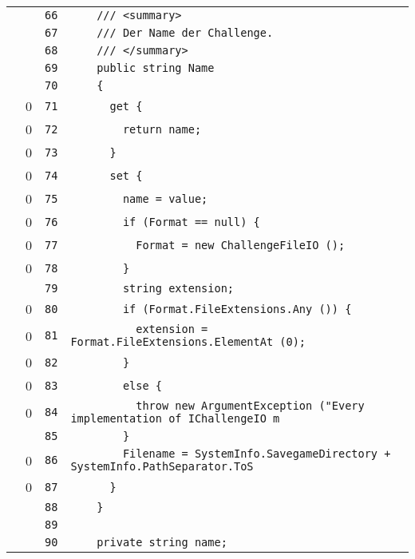 \documentclass[a4paper,10pt]{article}
\begin{document}
\begin{longtable}[l]{lrrl}
\cellcolor{gray} &  & \verb~66~ & \verb~    /// <summary>~\\
\cellcolor{gray} &  & \verb~67~ & \verb~    /// Der Name der Challenge.~\\
\cellcolor{gray} &  & \verb~68~ & \verb~    /// </summary>~\\
\cellcolor{gray} &  & \verb~69~ & \verb~    public string Name~\\
\cellcolor{gray} &  & \verb~70~ & \verb~    {~\\
\cellcolor{red} & 0 & \verb~71~ & \verb~      get {~\\
\cellcolor{red} & 0 & \verb~72~ & \verb~        return name;~\\
\cellcolor{red} & 0 & \verb~73~ & \verb~      }~\\
\cellcolor{red} & 0 & \verb~74~ & \verb~      set {~\\
\cellcolor{red} & 0 & \verb~75~ & \verb~        name = value;~\\
\cellcolor{red} & 0 & \verb~76~ & \verb~        if (Format == null) {~\\
\cellcolor{red} & 0 & \verb~77~ & \verb~          Format = new ChallengeFileIO ();~\\
\cellcolor{red} & 0 & \verb~78~ & \verb~        }~\\
\cellcolor{gray} &  & \verb~79~ & \verb~        string extension;~\\
\cellcolor{red} & 0 & \verb~80~ & \verb~        if (Format.FileExtensions.Any ()) {~\\
\cellcolor{red} & 0 & \verb~81~ & \verb~          extension = Format.FileExtensions.ElementAt (0);~\\
\cellcolor{red} & 0 & \verb~82~ & \verb~        }~\\
\cellcolor{red} & 0 & \verb~83~ & \verb~        else {~\\
\cellcolor{red} & 0 & \verb~84~ & \verb~          throw new ArgumentException ("Every implementation of IChallengeIO m~\\
\cellcolor{gray} &  & \verb~85~ & \verb~        }~\\
\cellcolor{red} & 0 & \verb~86~ & \verb~        Filename = SystemInfo.SavegameDirectory + SystemInfo.PathSeparator.ToS~\\
\cellcolor{red} & 0 & \verb~87~ & \verb~      }~\\
\cellcolor{gray} &  & \verb~88~ & \verb~    }~\\
\cellcolor{gray} &  & \verb~89~ & \verb~~\\
\cellcolor{gray} &  & \verb~90~ & \verb~    private string name;~\\

\end{longtable}
\end{document}
